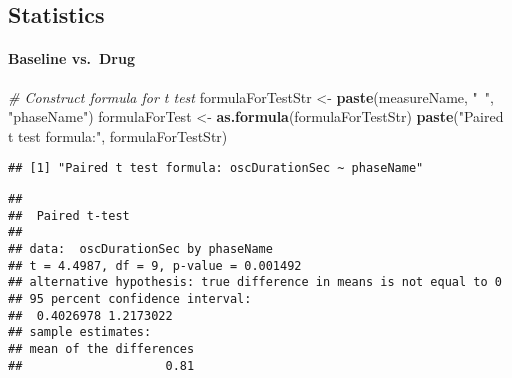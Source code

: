 \documentclass[]{article}
\newenvironment{Shaded}{\begin{snugshade}}{\end{snugshade}}
\newcommand{\CommentTok}[1]{\textcolor[rgb]{0.56,0.35,0.01}{\textit{#1}}}
\newcommand{\DataTypeTok}[1]{\textcolor[rgb]{0.13,0.29,0.53}{#1}}
\newcommand{\DecValTok}[1]{\textcolor[rgb]{0.00,0.00,0.81}{#1}}
\newcommand{\KeywordTok}[1]{\textcolor[rgb]{0.13,0.29,0.53}{\textbf{#1}}}
\newcommand{\NormalTok}[1]{#1}
\newcommand{\OperatorTok}[1]{\textcolor[rgb]{0.81,0.36,0.00}{\textbf{#1}}}
\newcommand{\OtherTok}[1]{\textcolor[rgb]{0.56,0.35,0.01}{#1}}
\newcommand{\StringTok}[1]{\textcolor[rgb]{0.31,0.60,0.02}{#1}}
\let\oldparagraph\paragraph
\renewcommand{\paragraph}[1]{\oldparagraph{#1}\mbox{}}
\begin{document}
\hypertarget{statistics}{%
\subsection{Statistics}\label{statistics}}

\hypertarget{baseline-vs.-drug}{%
\paragraph{Baseline vs.~Drug}\label{baseline-vs.-drug}}

\begin{Shaded}
\begin{Highlighting}[]
\CommentTok{# Construct formula for t test}
\NormalTok{formulaForTestStr <-}\StringTok{ }\KeywordTok{paste}\NormalTok{(measureName, }\StringTok{"~"}\NormalTok{, }\StringTok{"phaseName"}\NormalTok{)}
\NormalTok{formulaForTest <-}\StringTok{ }\KeywordTok{as.formula}\NormalTok{(formulaForTestStr)}
\KeywordTok{paste}\NormalTok{(}\StringTok{"Paired t test formula:"}\NormalTok{, formulaForTestStr)}
\end{Highlighting}
\end{Shaded}

\begin{verbatim}
## [1] "Paired t test formula: oscDurationSec ~ phaseName"
\end{verbatim}

\begin{Shaded}
\end{Shaded}

\begin{verbatim}
## 
##  Paired t-test
## 
## data:  oscDurationSec by phaseName
## t = 4.4987, df = 9, p-value = 0.001492
## alternative hypothesis: true difference in means is not equal to 0
## 95 percent confidence interval:
##  0.4026978 1.2173022
## sample estimates:
## mean of the differences 
##                    0.81
\end{verbatim}
\end{document}
